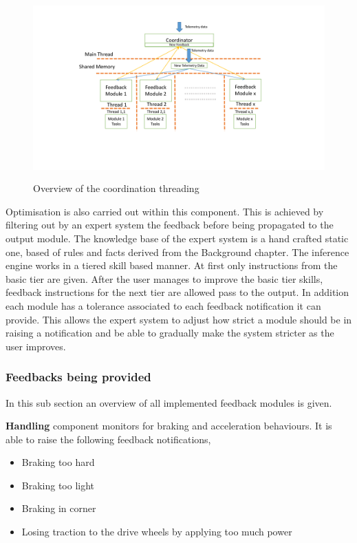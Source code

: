 \begin{figure}[!htb]
	\centering
	\includegraphics[height=7cm]{diagrams/multithreading.pdf}
	\caption{Overview of the coordination threading}
	\label{fig:multithreading}
\end{figure}

Optimisation is also carried out within this component. This is achieved by filtering out by an expert system the feedback before being propagated to the output module. The knowledge base of the expert system is a hand crafted static one, based of rules and facts derived from the Background chapter. The inference engine works in a tiered skill based manner. At first only instructions from the basic tier are given. After the user manages to improve the basic tier skills, feedback instructions for the next tier are allowed pass to the output. In addition each module has a tolerance associated to each feedback notification it can provide. This allows the expert system to adjust how strict a module should be in raising a notification and be able to gradually make the system stricter as the user improves.

\subsubsection{Feedbacks being provided}
In this sub section an overview of all implemented feedback modules is given.

\textbf{Handling} component monitors for braking and acceleration behaviours. It is able to raise the following feedback notifications, 
\begin{itemize}
	\item Braking too hard
	\item Braking too light
	\item Braking in corner
	\item Losing traction to the drive wheels by applying too much power
\end{itemize}

